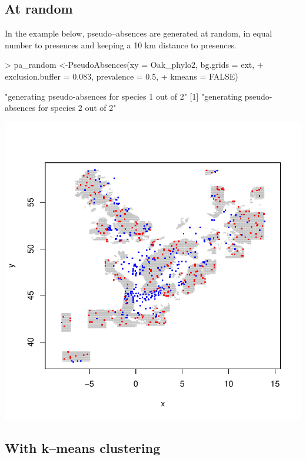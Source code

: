 \documentclass[10pt,a4paper]{report}
\begin{document}
\subsection{At random}

In the example below, pseudo--absences are generated at random, in equal number to presences and keeping a 10 km distance to presences.
\begin{Schunk}
\begin{Sinput}
> pa_random <-PseudoAbsences(xy = Oak_phylo2, bg.grids = ext, 
+ 	exclusion.buffer = 0.083, prevalence = 0.5, 
+   kmeans = FALSE)
\end{Sinput}
\begin{Soutput}
[1] "generating pseudo-absences for species 1 out of 2"
[1] "generating pseudo-absences for species 2 out of 2"
\end{Soutput}
\end{Schunk}
\includegraphics{mopa-mopa9}

\subsection{With k--means clustering}
\end{document}

